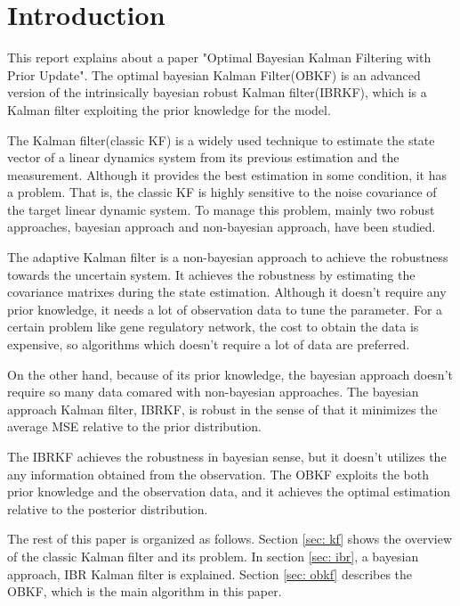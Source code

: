 \section{Introduction\label{introduction}}

This report explains about a paper "Optimal Bayesian Kalman Filtering with Prior Update"\cite{Dehghannasiri2018}. 
The optimal bayesian Kalman Filter(OBKF) is an advanced version of the intrinsically bayesian robust Kalman filter(IBRKF)\cite{Dehghannasiri2017}, which is a Kalman filter exploiting the prior knowledge for the model.

The Kalman filter(classic KF)\cite{Kalman1960} is a widely used technique to estimate the state vector of a linear dynamics system from its previous estimation and the measurement. Although it provides the best estimation in some condition, it has a problem. 
That is, the classic KF is highly sensitive to the noise covariance of the target linear dynamic system\cite{Sangsuk-Iam1990}. To manage this problem, mainly two robust approaches, bayesian approach and non-bayesian approach, have been studied. 

The adaptive Kalman filter\cite{Myers1976}\cite{Mehra1972} is a non-bayesian approach to achieve the robustness towards the uncertain system. It achieves the robustness by estimating the covariance matrixes during the state estimation. Although it doesn't require any prior knowledge, it needs a lot of observation data to tune the parameter. For a certain problem like gene regulatory network, the cost to obtain the data is expensive, so algorithms which doesn't require a lot of data are preferred.

On the other hand, because of its prior knowledge, the bayesian approach doesn't require so many data comared with non-bayesian approaches. The bayesian approach Kalman filter, IBRKF, is robust in the sense of that it minimizes the average MSE relative to the prior distribution. 

The IBRKF achieves the robustness in bayesian sense, but it doesn't utilizes the any information obtained from the observation. The OBKF exploits the both prior knowledge and the observation data, and it achieves the optimal estimation relative to the posterior distribution.

The rest of this paper is organized as follows. Section \ref{sec: kf} shows the overview of the classic Kalman filter and its problem. In section \ref{sec: ibr}, a bayesian approach, IBR Kalman filter is explained. Section \ref{sec: obkf} describes the OBKF, which is the main algorithm in this paper.